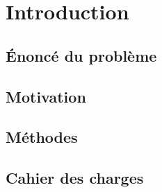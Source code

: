 \chapter{Introduction}

\section{Énoncé du problème}

\section{Motivation}

\section{Méthodes}

\section{Cahier des charges}

\clearpage
